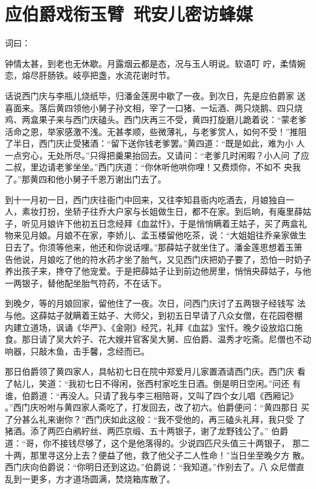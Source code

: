 \chapter{应伯爵戏衔玉臂~玳安儿密访蜂媒}

词曰：

钟情太甚，到老也无休歇。月露烟云都是态，况与玉人明说。软语叮
咛，柔情婉恋，熔尽肝肠铁。岐亭把盏，水流花谢时节。

话说西门庆与李瓶儿烧纸毕，归潘金莲房中歇了一夜。到次日，先是应伯爵家
送喜面来。落后黄四领他小舅子孙文相，宰了一口猪、一坛酒、两只烧鹅、四只烧
鸡、两盒果子来与西门庆磕头。西门庆再三不受，黄四打旋磨儿跪着说：“蒙老爹
活命之恩，举家感激不浅。无甚孝顺，些微薄礼，与老爹赏人，如何不受！”推阻
了半日，西门庆止受猪酒：“留下送你钱老爹罢。”黄四道：“既是如此，难为小
人一点穷心，无处所尽。”只得把羹果抬回去。又请问：“老爹几时闲暇？小人问
了应二叔，里边请老爹坐坐。”西门庆道：“你休听他哄你哩！又费烦你，不如不
央我了。”那黄四和他小舅子千恩万谢出门去了。

到十一月初一日，西门庆往衙门中回来，又往李知县衙内吃酒去，月娘独自一
人，素妆打扮，坐轿子往乔大户家与长姐做生日，都不在家。到后晌，有庵里薛姑
子，听见月娘许下他初五日念经拜《血盆忏》，于是悄悄瞒着王姑子，买了两盒礼
物来见月娘。月娘不在家，李娇儿、孟玉楼留他吃茶，说：“大姐姐往乔亲家做生
日去了。你须等他来，他还和你说话哩。”那薛姑子就坐住了。潘金莲思想着玉箫
告他说，月娘吃了他的符水药才坐了胎气，又见西门庆把奶子要了，恐怕一时奶子
养出孩子来，搀夺了他宠爱。于是把薛姑子让到前边他房里，悄悄央薛姑子，与他
一两银子，替他配坐胎气符药，不在话下。

到晚夕，等的月娘回家，留他住了一夜。次日，问西门庆讨了五两银子经钱写
法与他。这薛姑子就瞒着王姑子、大师父，到初五日早请了八众女僧，在花园卷棚
内建立道场，讽诵《华严》、《金刚》经咒，礼拜《血盆》宝忏。晚夕设放焰口施
食。那日请了吴大妗子、花大嫂并官客吴大舅、应伯爵、温秀才吃斋。尼僧也不动
响器，只敲木鱼，击手馨，念经而已。

那日伯爵领了黄四家人，具帖初七日在院中郑爱月儿家置酒请西门庆。西门庆
看了帖儿，笑道：“我初七日不得闲，张西村家吃生日酒。倒是明日空闲。”问还
有谁，伯爵道：“再没人。只请了我与李三相陪哥，又叫了四个女儿唱《西厢记》
。”西门庆吩咐与黄四家人斋吃了，打发回去，改了初六。伯爵便问：“黄四那日
买了分甚么礼来谢你？”西门庆如此这般：“我不受他的，再三磕头礼拜，我只受
了猪酒。添了两匹白鹇紵丝、两匹京缎、五十两银子，谢了龙野钱公了。”
伯爵道：“哥，你不接钱尽够了，这个是他落得的。少说四匹尺头值三十两银子，
那二十两，那里寻这分上去？便益了他，救了他父子二人性命！”当日坐至晚夕方
散。西门庆向伯爵说：“你明日还到这边。”伯爵说：“我知道。”作别去了。八
众尼僧直乱到一更多，方才道场圆满，焚烧箱库散了。

